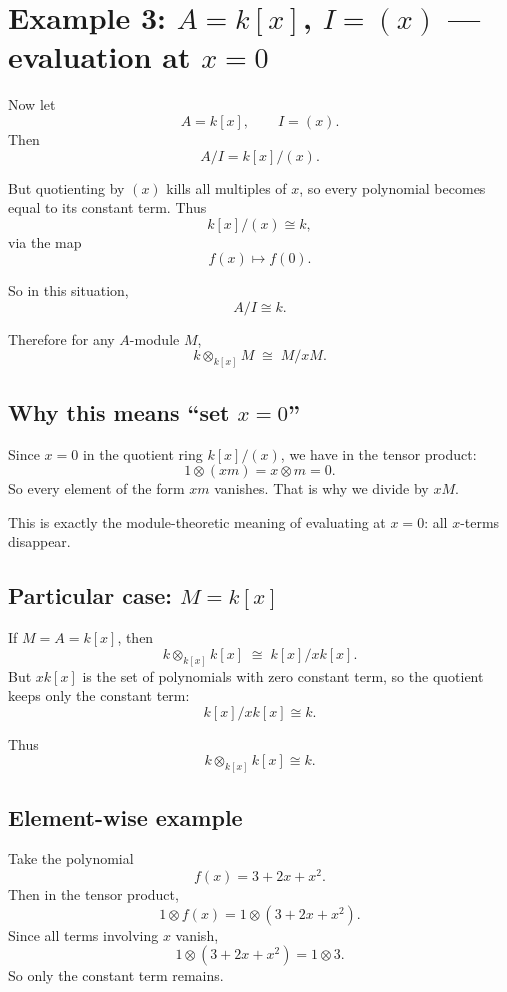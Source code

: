 \documentclass[12pt,a4paper]{article}
\theoremstyle{plain}
\theoremstyle{definition}      %
\begin{document}
	\section{Example 3: \texorpdfstring{$A=k[x]$, $I=(x)$}{A=k[x], I=(x)} --- evaluation at \texorpdfstring{$x=0$}{x=0}}
	
	Now let
	\[
	A=k[x], \qquad I=(x).
	\]
	Then
	\[
	A/I = k[x]/(x).
	\]
	
	But quotienting by \((x)\) kills all multiples of \(x\), so every polynomial becomes equal to its constant term. Thus
	\[
	k[x]/(x)\cong k,
	\]
	via the map
	\[
	f(x)\longmapsto f(0).
	\]
	
	So in this situation,
	\[
	A/I \cong k.
	\]
	
	Therefore for any \(A\)-module \(M\),
	\[
	k\otimes_{k[x]} M \;\cong\; M/xM.
	\]
	
	\subsection{Why this means ``set \texorpdfstring{$x=0$}{x=0}''}
	
	Since \(x=0\) in the quotient ring \(k[x]/(x)\), we have in the tensor product:
	\[
	1\otimes (xm)=x\otimes m=0.
	\]
	So every element of the form \(xm\) vanishes. That is why we divide by \(xM\).
	
	This is exactly the module-theoretic meaning of evaluating at \(x=0\): all \(x\)-terms disappear.
	
	\subsection{Particular case: \texorpdfstring{$M=k[x]$}{M=k[x]}}
	
	If \(M=A=k[x]\), then
	\[
	k\otimes_{k[x]} k[x]
	\;\cong\;
	k[x]/xk[x].
	\]
	But \(xk[x]\) is the set of polynomials with zero constant term, so the quotient keeps only the constant term:
	\[
	k[x]/xk[x] \cong k.
	\]
	
	Thus
	\[
	k\otimes_{k[x]}k[x]\cong k.
	\]
	
	\subsection{Element-wise example}
	
	Take the polynomial
	\[
	f(x)=3+2x+x^2.
	\]
	Then in the tensor product,
	\[
	1\otimes f(x)
	=
	1\otimes (3+2x+x^2).
	\]
	Since all terms involving \(x\) vanish,
	\[
	1\otimes (3+2x+x^2)=1\otimes 3.
	\]
	So only the constant term remains.
	
\end{document}
